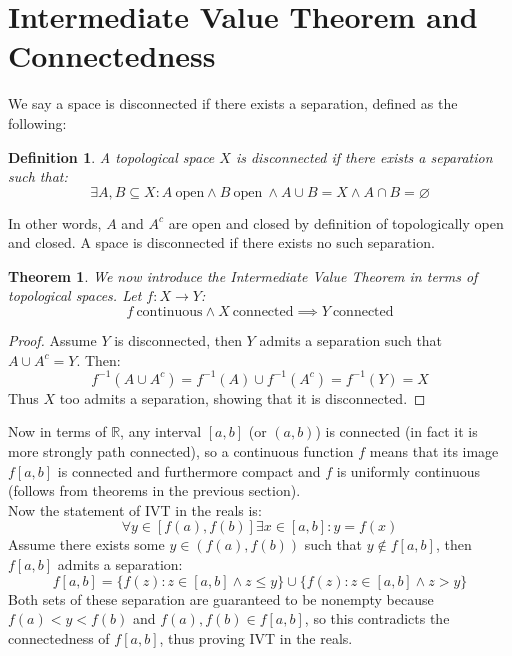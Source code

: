 \documentclass[10pt,letterpaper]{article} %
\newtheorem{thm}{Theorem}[section]
\newtheorem{defn}{Definition}[section]
\begin{document}
\section{Intermediate Value Theorem and Connectedness}
We say a space is disconnected if there exists a separation, defined as the following:
\begin{defn}
A topological space $X$ is disconnected if there exists a separation such that:
\begin{equation*}
\exists A, B \subseteq X: A \ \text{open} \land B \ \text{open} \ \land A \cup B = X \land A \cap B = \varnothing
\end{equation*}
\end{defn}
In other words, $A$ and $A^c$ are open and closed by definition of topologically open and closed. A space is disconnected if there exists no such separation.\\

\begin{thm}
We now introduce the Intermediate Value Theorem in terms of topological spaces. Let $f: X \xrightarrow{} Y$:
\begin{equation*}
f \ \text{continuous} \land X \ \text{connected} \implies Y \ \text{connected}
\end{equation*}
\end{thm}
\begin{proof}
Assume $Y$ is disconnected, then $Y$ admits a separation such that $A \cup A^c = Y$. Then:
\begin{equation*}
  f^{-1}(A \cup A^c) = f^{-1}(A) \cup f^{-1}(A^c) = f^{-1}(Y) = X
\end{equation*}
Thus $X$ too admits a separation, showing that it is disconnected.
\end{proof}

Now in terms of $\mathbb{R}$, any interval $[a, b]$ (or $(a, b)$) is connected (in fact it is more strongly path connected), so a continuous function $f$ means that its image $f[a, b]$ is connected and furthermore compact and $f$ is uniformly continuous (follows from theorems in the previous section).\\

Now the statement of IVT in the reals is:
\begin{equation*}
\forall y \in [f(a), f(b)] \exists x \in [a, b]: y = f(x)
\end{equation*}
Assume there exists some $y \in (f(a), f(b))$ such that $y \notin f[a, b]$, then $f[a, b]$ admits a separation:
\begin{equation*}
  f[a,b] = \{f(z) : z \in [a, b] \land z \leqslant y\} \cup \{f(z): z \in [a, b] \land z > y\}
\end{equation*}
Both sets of these separation are guaranteed to be nonempty because $f(a) < y < f(b)$ and $f(a), f(b) \in f[a, b]$, so this contradicts the connectedness of $f[a, b]$, thus proving IVT in the reals.\\
\end{document}
